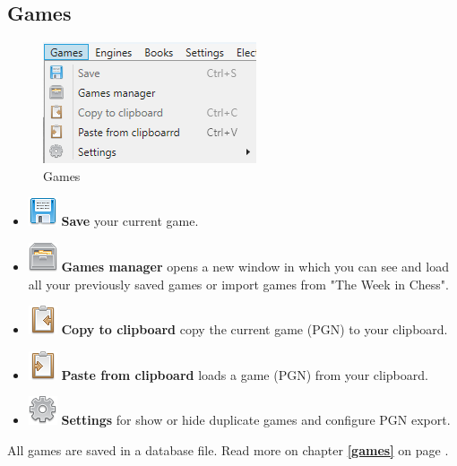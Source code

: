 \documentclass[11pt,a4paper]{article}
\begin{document}
	\subsection{Games}
	\begin{figure}[H]
		\centering
		\includegraphics[scale=1.0]{Games1.png}
		\caption{Games}
		\label{fig:Games}
	\end{figure}
	\begin{itemize}
		\item \includegraphics[scale=0.5]{diskette.png} \textbf{Save} your current game.
		\item \includegraphics[scale=0.5]{file_manager.png}  \textbf{Games manager} opens a new window in which you can see and load all your previously saved games or import games from "The Week in Chess".
		\item \includegraphics[scale=0.5]{clipboard_sign_out.png}  \textbf{Copy to clipboard} copy the current game (PGN) to your clipboard.	
		\item \includegraphics[scale=0.5]{clipboard_sign.png}  \textbf{Paste from clipboard} loads a game (PGN) from your clipboard.
		\item \includegraphics[scale=0.5]{cog.png}  \textbf{Settings} for show or hide duplicate games and configure PGN export.
		
	\end{itemize}
	All games are saved in a database file. Read more on chapter \textbf{\ref{games}  } on page \pageref{games}.
	
\end{document}
